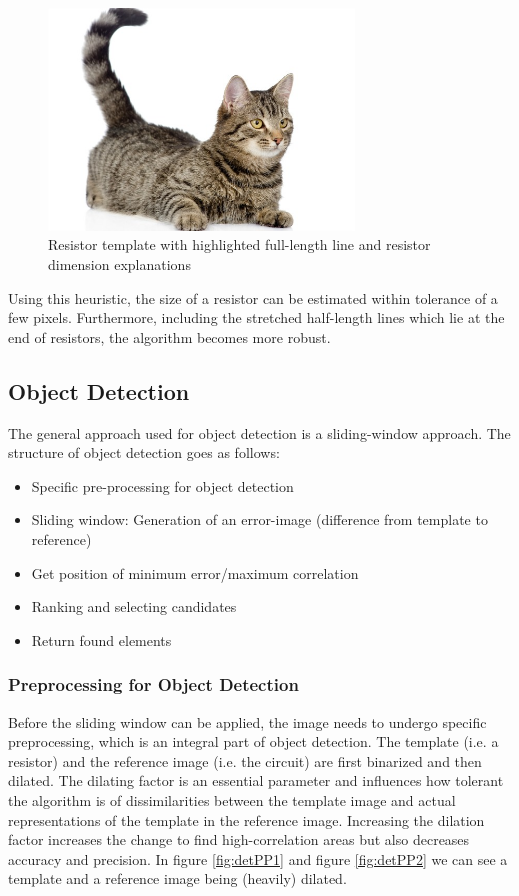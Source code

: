\documentclass[10pt,twocolumn,letterpaper]{article}
\begin{document}
\begin{figure}[!ht]
\includegraphics[width = 3.2in]{img/cat.jpg}
\caption{Resistor template with highlighted full-length line and resistor dimension explanations}
\label{fig:c9}
\end{figure}

\par
Using this heuristic, the size of a resistor can be estimated within tolerance of a few pixels. Furthermore, including the stretched half-length lines which lie at the end of resistors, the algorithm becomes more robust.

\subsection{Object Detection}
\label{subsec:obj}

The general approach used for object detection is a sliding-window approach. The structure of object detection goes as follows: 
\begin{itemize}
	\item Specific pre-processing for object detection
	\item Sliding window: Generation of an error-image (difference from template to reference)
	\item Get position of minimum error/maximum correlation
	\item Ranking and selecting candidates
	\item Return found elements
\end{itemize}

\subsubsection*{Preprocessing for Object Detection}

Before the sliding window can be applied, the image needs to undergo specific preprocessing, which is an integral part of object detection. The template (i.e. a resistor) and the reference image (i.e. the circuit) are first binarized and then dilated. The dilating factor is an essential parameter and influences how tolerant the algorithm is of dissimilarities between the template image and actual representations of the template in the reference image. Increasing the dilation factor increases the change to find high-correlation areas but also decreases accuracy and precision. In figure \ref{fig:detPP1} and figure \ref{fig:detPP2} we can see a template and a reference image being (heavily) dilated.
\par
\end{document}

